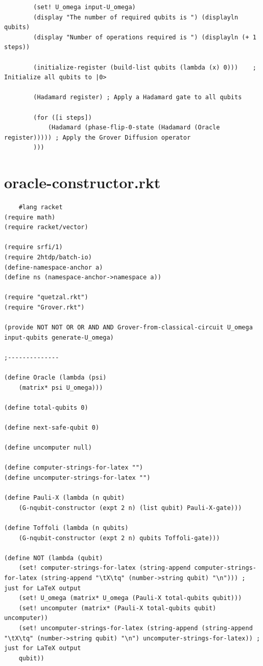 \documentclass[11pt]{article}
\begin{document}
\begin{appendices}
\begin{lstlisting}
		(set! U_omega input-U_omega)
		(display "The number of required qubits is ") (displayln qubits)
		(display "Number of operations required is ") (displayln (+ 1 steps))

		(initialize-register (build-list qubits (lambda (x) 0)))	; Initialize all qubits to |0>

		(Hadamard register)	; Apply a Hadamard gate to all qubits

		(for ([i steps])
			(Hadamard (phase-flip-0-state (Hadamard (Oracle register))))) ; Apply the Grover Diffusion operator
		)))
	\end{lstlisting}
	\section{oracle-constructor.rkt}
	\begin{lstlisting}
	#lang racket
(require math)
(require racket/vector)

(require srfi/1)
(require 2htdp/batch-io)
(define-namespace-anchor a)
(define ns (namespace-anchor->namespace a))

(require "quetzal.rkt")
(require "Grover.rkt")

(provide NOT NOT OR OR AND AND Grover-from-classical-circuit U_omega input-qubits generate-U_omega)

;--------------

(define Oracle (lambda (psi)
	(matrix* psi U_omega)))

(define total-qubits 0)

(define next-safe-qubit 0)

(define uncomputer null)

(define computer-strings-for-latex "")
(define uncomputer-strings-for-latex "")

(define Pauli-X (lambda (n qubit)
	(G-nqubit-constructor (expt 2 n) (list qubit) Pauli-X-gate)))

(define Toffoli (lambda (n qubits)
	(G-nqubit-constructor (expt 2 n) qubits Toffoli-gate)))

(define NOT (lambda (qubit)
	(set! computer-strings-for-latex (string-append computer-strings-for-latex (string-append "\tX\tq" (number->string qubit) "\n"))) ; just for LaTeX output
	(set! U_omega (matrix* U_omega (Pauli-X total-qubits qubit)))
	(set! uncomputer (matrix* (Pauli-X total-qubits qubit) uncomputer))
	(set! uncomputer-strings-for-latex (string-append (string-append "\tX\tq" (number->string qubit) "\n") uncomputer-strings-for-latex)) ; just for LaTeX output
	qubit))


\end{lstlisting}
\end{appendices}
\end{document}

